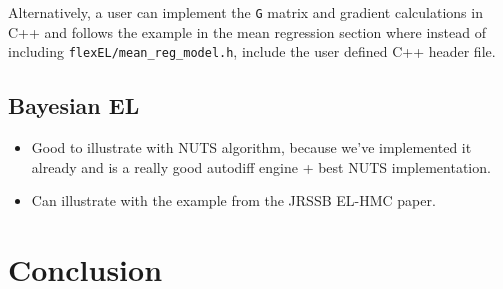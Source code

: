 \documentclass[article]{jss}
\renewcommand{\|}{\,|\,}
\begin{document}
Alternatively, a user can implement the \texttt{G} matrix and gradient calculations in C++ and follows the example in the mean regression section where instead of including \texttt{flexEL/mean\_reg\_model.h}, include the user defined C++ header file.

\hypertarget{bayesian-el}{%
\subsection{Bayesian EL}\label{bayesian-el}}

\begin{itemize}
\item
  Good to illustrate with  NUTS algorithm, because we've implemented it already and  is a really good autodiff engine + best NUTS implementation.
\item
  Can illustrate with the example from the JRSSB EL-HMC paper.
\end{itemize}

\hypertarget{conclusion}{%
\section*{Conclusion}\label{conclusion}}
\end{document}
